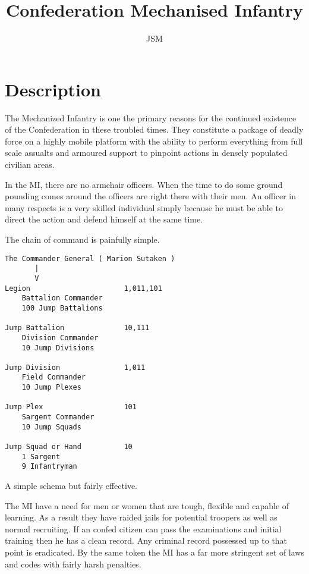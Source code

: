
\title{Confederation Mechanised Infantry}
\author{JSM}
\maketitle
\section{Description}

The Mechanized Infantry is one the primary reasons for the continued 
existence of the Confederation in these troubled times. They 
constitute a package of deadly force on a highly mobile platform with 
the ability to perform everything from full scale assualts and 
armoured support to pinpoint actions in densely populated civilian 
areas.

In the MI, there are no armchair officers. When the time to do some
ground pounding comes around the officers are right there with their 
men. An officer in many respects is a very skilled individual simply 
because he must be able to direct the action and defend himself at 
the same time. 

The chain of command is painfully simple. 

\begin{verbatim}
The Commander General ( Marion Sutaken )
       |
	   V	
Legion						1,011,101	
	Battalion Commander
	100 Jump Battalions   

Jump Battalion				10,111
	Division Commander           
    10 Jump Divisions      

Jump Division               1,011 
	Field Commander
	10 Jump Plexes	      

Jump Plex					101
	Sargent Commander         
    10 Jump Squads		    

Jump Squad or Hand			10 
	1 Sargent                
    9 Infantryman       	 
\end{verbatim}

A simple schema but fairly effective. 

The MI have a need for men or women that are tough, flexible and 
capable of learning. As a result they have raided jails for potential 
troopers as well as normal recruiting. If an confed citizen can pass 
the examinations and initial training then he has a clean record. Any 
criminal record possessed up to that point is eradicated. By the same 
token the MI has a far more stringent set of laws and codes with 
fairly harsh penalties. 

